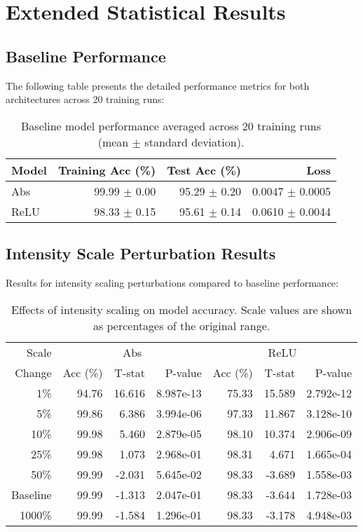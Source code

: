 \appendix
\section{Extended Statistical Results}

\subsection{Baseline Performance}

The following table presents the detailed performance metrics for both architectures across 20 training runs:

\begin{table}[h]
\centering
\begin{tabular}{lrrr}
\hline
Model & Training Acc (\%) & Test Acc (\%) & Loss \\
\hline
Abs & 99.99 $\pm$ 0.00 & 95.29 $\pm$ 0.20 & 0.0047 $\pm$ 0.0005 \\
ReLU & 98.33 $\pm$ 0.15 & 95.61 $\pm$ 0.14 & 0.0610 $\pm$ 0.0044 \\
\hline
\end{tabular}
\caption{Baseline model performance averaged across 20 training runs (mean $\pm$ standard deviation).}
\label{tab:app_b_baseline}
\end{table}

\subsection{Intensity Scale Perturbation Results}

Results for intensity scaling perturbations compared to baseline performance:

\begin{table}[h]
\centering
\begin{tabular}{r|rrr|rrr}
Scale & \multicolumn{3}{|c|}{Abs} & \multicolumn{3}{|c}{ReLU} \\
Change & Acc (\%) & T-stat & P-value & Acc (\%) & T-stat & P-value \\
\hline
1\% & 94.76 & 16.616 & 8.987e-13 & 75.33 & 15.589 & 2.792e-12 \\
5\% & 99.86 & 6.386 & 3.994e-06 & 97.33 & 11.867 & 3.128e-10 \\
10\% & 99.98 & 5.460 & 2.879e-05 & 98.10 & 10.374 & 2.906e-09 \\
25\% & 99.98 & 1.073 & 2.968e-01 & 98.31 & 4.671 & 1.665e-04 \\
50\% & 99.99 & -2.031 & 5.645e-02 & 98.33 & -3.689 & 1.558e-03 \\
Baseline & 99.99 & -1.313 & 2.047e-01 & 98.33 & -3.644 & 1.728e-03 \\
1000\% & 99.99 & -1.584 & 1.296e-01 & 98.33 & -3.178 & 4.948e-03 \\
\end{tabular}
\caption{Effects of intensity scaling on model accuracy. Scale values are shown as percentages of the original range.}
\label{tab:app_b_scale}
\end{table}


